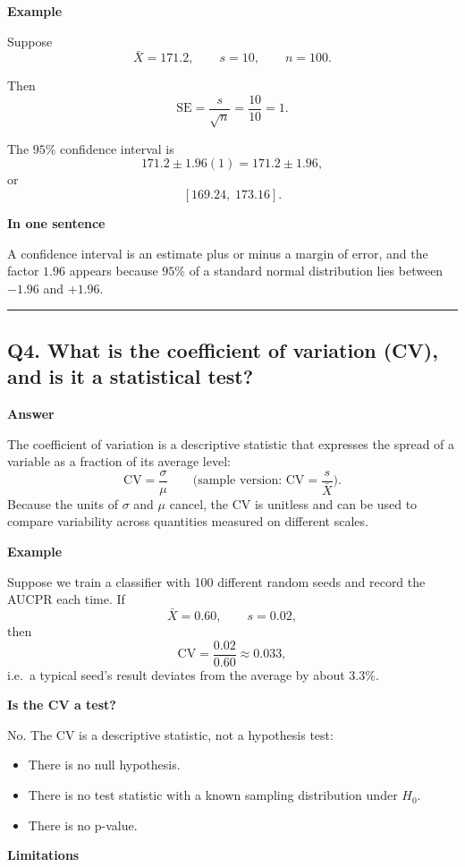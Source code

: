 \documentclass[11pt]{article}
\begin{document}
\textbf{Example}

Suppose
\[
\bar X = 171.2,\qquad s=10,\qquad n=100.
\]

Then
\[
\text{SE}
=
\frac{s}{\sqrt n}
=
\frac{10}{10}
=
1.
\]

The \(95\%\) confidence interval is
\[
171.2 \pm 1.96(1)
=
171.2 \pm 1.96,
\]
or
\[
[169.24,\;173.16].
\]

\textbf{In one sentence}

A confidence interval is an estimate plus or minus a margin of error, and the factor \(1.96\) appears because \(95\%\) of a standard normal distribution lies between \(-1.96\) and \(+1.96\).

\vspace{5mm}
\hrule
\vspace{5mm}

\subsection*{Q4. What is the coefficient of variation (CV), and is it a statistical test?}

\textbf{Answer}

The coefficient of variation is a descriptive statistic that expresses the spread of a variable as a fraction of its average level:
\[
\boxed{
\mathrm{CV}=\frac{\sigma}{\mu}
}
\qquad\text{(sample version: } \mathrm{CV}=\frac{s}{\bar X}\text{)}.
\]
Because the units of \(\sigma\) and \(\mu\) cancel, the CV is unitless and can be used to compare variability across quantities measured on different scales.

\textbf{Example}

Suppose we train a classifier with 100 different random seeds and record the AUCPR each time. If
\[
\bar X = 0.60,\qquad s = 0.02,
\]
then
\[
\mathrm{CV}=\frac{0.02}{0.60}\approx 0.033,
\]
i.e.\ a typical seed's result deviates from the average by about \(3.3\%\).

\textbf{Is the CV a test?}

No. The CV is a descriptive statistic, not a hypothesis test:
\begin{itemize}
    \item There is no null hypothesis.
    \item There is no test statistic with a known sampling distribution under \(H_0\).
    \item There is no p-value.
\end{itemize}

\textbf{Limitations}
\end{document}
